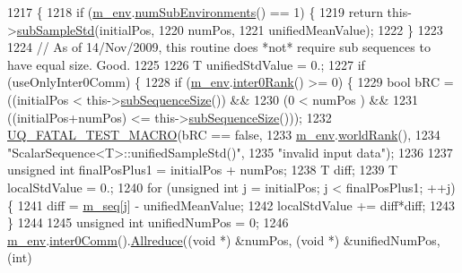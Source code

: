\begin{DoxyCode}
1217 \{
1218   \textcolor{keywordflow}{if} (\hyperlink{class_q_u_e_s_o_1_1_scalar_sequence_a71618cd6351b29361b437af68447a4c8}{m\_env}.\hyperlink{class_q_u_e_s_o_1_1_base_environment_ac0345f57e31ef7833e379ed972bd094d}{numSubEnvironments}() == 1) \{
1219     \textcolor{keywordflow}{return} this->\hyperlink{class_q_u_e_s_o_1_1_scalar_sequence_a602553eda9cecc0bd1cdaf7d6616be9f}{subSampleStd}(initialPos,
1220                                    numPos,
1221                                    unifiedMeanValue);
1222   \}
1223 
1224   \textcolor{comment}{// As of 14/Nov/2009, this routine does *not* require sub sequences to have equal size. Good.}
1225 
1226   T unifiedStdValue = 0.;
1227   \textcolor{keywordflow}{if} (useOnlyInter0Comm) \{
1228     \textcolor{keywordflow}{if} (\hyperlink{class_q_u_e_s_o_1_1_scalar_sequence_a71618cd6351b29361b437af68447a4c8}{m\_env}.\hyperlink{class_q_u_e_s_o_1_1_base_environment_ae106b5bb8a80b655b88b3a26b1e7c185}{inter0Rank}() >= 0) \{
1229       \textcolor{keywordtype}{bool} bRC = ((initialPos          <  this->\hyperlink{class_q_u_e_s_o_1_1_scalar_sequence_a0288ea295eedc216a1617b3286f6f3a0}{subSequenceSize}()) &&
1230                   (0                   <  numPos                 ) &&
1231                   ((initialPos+numPos) <= this->\hyperlink{class_q_u_e_s_o_1_1_scalar_sequence_a0288ea295eedc216a1617b3286f6f3a0}{subSequenceSize}()));
1232       \hyperlink{_defines_8h_a56d63d18d0a6d45757de47fcc06f574d}{UQ\_FATAL\_TEST\_MACRO}(bRC == \textcolor{keyword}{false},
1233                           \hyperlink{class_q_u_e_s_o_1_1_scalar_sequence_a71618cd6351b29361b437af68447a4c8}{m\_env}.\hyperlink{class_q_u_e_s_o_1_1_base_environment_a78b57112bbd0e6dd0e8afec00b40ffa7}{worldRank}(),
1234                           \textcolor{stringliteral}{"ScalarSequence<T>::unifiedSampleStd()"},
1235                           \textcolor{stringliteral}{"invalid input data"});
1236 
1237       \textcolor{keywordtype}{unsigned} \textcolor{keywordtype}{int} finalPosPlus1 = initialPos + numPos;
1238       T diff;
1239       T localStdValue = 0.;
1240       \textcolor{keywordflow}{for} (\textcolor{keywordtype}{unsigned} \textcolor{keywordtype}{int} j = initialPos; j < finalPosPlus1; ++j) \{
1241         diff = \hyperlink{class_q_u_e_s_o_1_1_scalar_sequence_ae616036fd2e62fb69df167814545e893}{m\_seq}[j] - unifiedMeanValue;
1242         localStdValue += diff*diff;
1243       \}
1244 
1245       \textcolor{keywordtype}{unsigned} \textcolor{keywordtype}{int} unifiedNumPos = 0;
1246       \hyperlink{class_q_u_e_s_o_1_1_scalar_sequence_a71618cd6351b29361b437af68447a4c8}{m\_env}.\hyperlink{class_q_u_e_s_o_1_1_base_environment_a689e4d140c74d495d97eb498714a4b82}{inter0Comm}().\hyperlink{class_q_u_e_s_o_1_1_mpi_comm_a72e137e60ef8060efb1ee5fc874fa4b8}{Allreduce}((\textcolor{keywordtype}{void} *) &numPos, (\textcolor{keywordtype}{void} *) &unifiedNumPos, (\textcolor{keywordtype}{int})

\end{DoxyCode}
